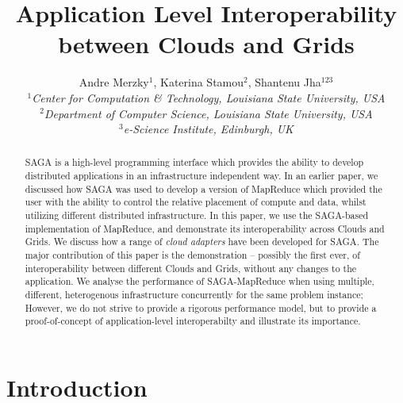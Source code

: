 \documentclass[conference,final]{IEEEtran}
\title{Application Level Interoperability between Clouds and Grids}
\author{Andre Merzky$^{1}$,  Katerina Stamou$^{2}$, Shantenu Jha$^{123}$\\
  \small{\emph{$^{1}$Center for Computation \& Technology, Louisiana
      State University, USA}}\\
  \small{\emph{$^{2}$Department of Computer Science, Louisiana State
      University, USA}}\\
  \small{\emph{$^{3}$e-Science Institute, Edinburgh, UK}}\\
}
\newcommand{\jhanote}[1]{ {\textcolor{red} { ***SJ: #1 }}}
\newcommand{\jhanote}[1]{}
\newcommand{\sagamapreduce }{SAGA-MapReduce }
\begin{document}
\maketitle

\begin{abstract}
  SAGA is a high-level programming interface which provides the
  ability to develop distributed applications in an infrastructure
  independent way. In an earlier paper, we discussed how SAGA was used
  to develop a version of MapReduce which provided the user with the
  ability to control the relative placement of compute and data,
  whilst utilizing different distributed infrastructure. In this
  paper, we use the SAGA-based implementation of MapReduce, and
  demonstrate its interoperability across Clouds and Grids.  We
  discuss how a range of {\it cloud adapters} have been developed for
  SAGA.  The major contribution of this paper is the demonstration --
  possibly the first ever, of interoperability between different
  Clouds and Grids, without any changes to the application. We analyse
  the performance of \sagamapreduce when using multiple, different,
  heterogenous infrastructure concurrently for the same problem
  instance;
  However, we do not strive to provide a rigorous performance model, but to
  provide a proof-of-concept of application-level interoperabilty and
  illustrate its importance.
\end{abstract}

\section{Introduction} 



\end{document}
